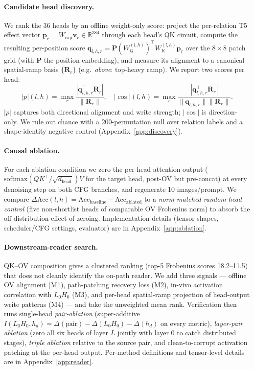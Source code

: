 \documentclass{article}
\theoremstyle{plain}
\theoremstyle{definition}
\begin{document}
\paragraph{Candidate head discovery.}
We rank the 36 heads by an offline weight-only score: project the per-relation T5 effect vector $\mathbf{p}_r = W_\text{cap}\mathbf{v}_r\!\in\!\mathbb{R}^{384}$ through each head's QK circuit, compute the resulting per-position score $\mathbf{q}_{l,h,r}\!=\!\mathbf{P}(W_Q^{(l,h)})^\top W_K^{(l,h)}\mathbf{p}_r$ over the $8\!\times\!8$ patch grid (with $\mathbf{P}$ the position embedding), and measure its alignment to a canonical spatial-ramp basis $\{\mathbf{R}_r\}$ (e.g.\ \textit{above}: top-heavy ramp). We report two scores per head:
\begin{equation}
|p|(l,h) = \max_r \frac{|\mathbf{q}_{l,h,r}^\top \mathbf{R}_r|}{\|\mathbf{R}_r\|}, \quad |\!\cos|(l,h) = \max_r \frac{|\mathbf{q}_{l,h,r}^\top \mathbf{R}_r|}{\|\mathbf{q}_{l,h,r}\|\|\mathbf{R}_r\|}.
\end{equation}
$|p|$ captures both directional alignment and write strength; $|\!\cos|$ is direction-only. We rule out chance with a 200-permutation null over relation labels and a shape-identity negative control (Appendix~\ref{app:discovery}).

\paragraph{Causal ablation.}
For each ablation condition we zero the per-head attention output ($\mathrm{softmax}(QK^\top/\sqrt{d_\text{head}})V$ for the target head, post-OV but pre-concat) at every denoising step on both CFG branches, and regenerate 10 images/prompt. We compare $\Delta\mathrm{Acc}(l,h) = \mathrm{Acc}_\text{baseline} - \mathrm{Acc}_\text{ablated}$ to a \emph{norm-matched random-head control} (five non-shortlist heads of comparable OV Frobenius norm) to absorb the off-distribution effect of zeroing. Implementation details (tensor shapes, scheduler/CFG settings, evaluator) are in Appendix~\ref{app:ablation}.

\paragraph{Downstream-reader search.}
QK--OV composition \citep{elhage2021mathematical} gives a clustered ranking (top-5 Frobenius scores 18.2--11.5) that does not cleanly identify the on-path reader. We add three signals --- offline OV alignment (M1), path-patching recovery loss (M2), in-vivo activation correlation with $L_0H_0$ (M3), and per-head spatial-ramp projection of head-output write patterns (M4) --- and take the unweighted mean rank. Verification then runs single-head \emph{pair-ablation} (super-additive $I(L_0H_0, h_d)\!=\!\Delta(\text{pair})\!-\!\Delta(L_0H_0)\!-\!\Delta(h_d)$ on every metric), \emph{layer-pair ablation} (zero all six heads of layer $L$ jointly with layer 0 to catch distributed stages), \emph{triple ablation} relative to the source pair, and clean-to-corrupt activation patching at the per-head output. Per-method definitions and tensor-level details are in Appendix~\ref{app:reader}.
\end{document}

